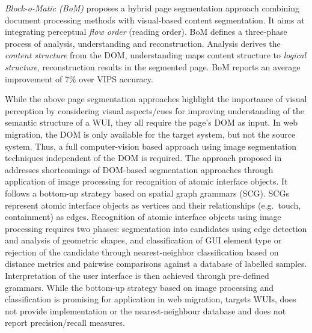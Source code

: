 \emph{Block-o-Matic (BoM)} \autocite{Sanoja2014} proposes a hybrid page segmentation approach combining document processing methods with visual-based content segmentation.
It aims at integrating perceptual \emph{flow order} (reading order).
BoM defines a three-phase process of analysis, understanding and reconstruction.
Analysis derives the \emph{content structure} from the DOM, understanding maps content structure to \emph{logical structure}, reconstruction results in the segmented page.
BoM reports an average improvement of 7\% over VIPS accuracy.

While the above page segmentation approaches highlight the importance of visual perception by considering visual aspects/cues for improving understanding of the semantic structure of a WUI, they all require the page's DOM as input.
In web migration, the DOM is only available for the target system, but not the source system.
Thus, a full computer-vision based approach using image segmentation techniques independent of the DOM is required.
The approach proposed in \autocite{Kong2012} addresses shortcomings of DOM-based segmentation approaches through application of image processing for recognition of atomic interface objects.
It follows a bottom-up strategy based on spatial graph grammars (SCG).
SCGs represent atomic interface objects as vertices and their relationships (e.g.~touch, containment) as edges.
Recognition of atomic interface objects using image processing requires two phases: segmentation into candidates using edge detection and analysis of geometric shapes, and classification of GUI element type or rejection of the candidate through nearest-neighbor classification based on distance metrics and pairwise comparisons against a database of labelled samples.
Interpretation of the user interface is then achieved through pre-defined grammars.
While the bottom-up strategy based on image processing and classification is promising for application in web migration, \autocite{Kong2012} targets WUIs, does not provide implementation or the nearest-neighbour database and does not report precision/recall measures.


